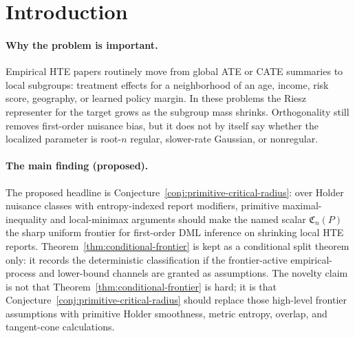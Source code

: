 \documentclass[11pt]{article}
\theoremstyle{definition}
\theoremstyle{plain}
\theoremstyle{remark}
\begin{document}
\section{Introduction}
\paragraph{Why the problem is important.}
Empirical HTE papers routinely move from global ATE or CATE summaries to local
subgroups: treatment effects for a neighborhood of an age, income, risk score,
geography, or learned policy margin.  In these problems the Riesz representer
for the target grows as the subgroup mass shrinks.  Orthogonality still removes
first-order nuisance bias, but it does not by itself say whether the localized
parameter is root-\(n\) regular, slower-rate Gaussian, or nonregular.

\paragraph{The main finding (proposed).}
The proposed headline is Conjecture~\ref{conj:primitive-critical-radius}: over
Holder nuisance classes with entropy-indexed report modifiers, primitive
maximal-inequality and local-minimax arguments should make the named scalar
\(\mathfrak C_n(P)\) the sharp uniform frontier for first-order DML inference
on shrinking local HTE reports.  Theorem~\ref{thm:conditional-frontier} is
kept as a conditional split theorem only: it records the deterministic
classification if the frontier-active empirical-process and lower-bound
channels are granted as assumptions.  The novelty claim is not that
Theorem~\ref{thm:conditional-frontier} is hard; it is that
Conjecture~\ref{conj:primitive-critical-radius} should replace those
high-level frontier assumptions with primitive Holder smoothness, metric
entropy, overlap, and tangent-cone calculations.
\end{document}
